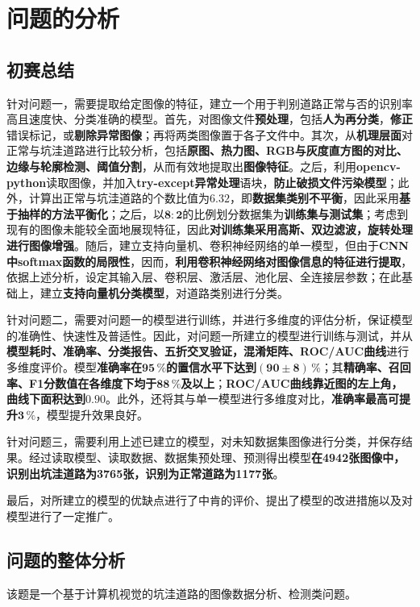 \documentclass{MathorCupmodeling}
\begin{document}
	\section{问题的分析}
	\subsection{初赛总结}
		{\heiti 针对问题一}，需要提取给定图像的特征，建立一个用于判别道路正常与否的识别率高且速度快、分类准确的模型。首先，对图像文件\textbf{预处理}，包括\textbf{人为再分类}，\textbf{修正}错误标记，或\textbf{剔除异常图像}；再将两类图像置于各子文件中。其次，从\textbf{机理层面}对正常与坑洼道路进行比较分析，包括\textbf{原图、热力图、RGB与灰度直方图的对比、边缘与轮廓检测、阈值分割}，从而有效地提取出\textbf{图像特征}。之后，利用\textbf{opencv-python}读取图像，并加入\textbf{try-except异常处理}语块，\textbf{防止破损文件污染模型}；此外，计算出正常与坑洼道路的个数比值为$\boldsymbol{6.32}$，即\textbf{数据集类别不平衡}，因此采用\textbf{基于抽样的方法平衡化}；之后，以$\boldsymbol{8:2}$的比例划分数据集为\textbf{训练集与测试集}；考虑到现有的图像未能较全面地展现特征，因此\textbf{对训练集采用高斯、双边滤波，旋转处理进行图像增强}。随后，建立支持向量机、卷积神经网络的单一模型，但由于\textbf{CNN中softmax函数的局限性}，因而，\textbf{利用卷积神经网络对图像信息的特征进行提取}，依据上述分析，设定其输入层、卷积层、激活层、池化层、全连接层参数；在此基础上，建立\textbf{支持向量机分类模型}，对道路类别进行分类。

		{\heiti 针对问题二}，需要对问题一的模型进行训练，并进行多维度的评估分析，保证模型的准确性、快速性及普适性。因此，对问题一所建立的模型进行训练与测试，并从\textbf{模型耗时、准确率、分类报告、五折交叉验证，混淆矩阵、ROC/AUC曲线}进行多维度评价。模型\textbf{准确率在$\boldsymbol{95\,\%}$的置信水平下达到$\boldsymbol{\left(90\pm 8\right)\,\%}$}；其\textbf{精确率、召回率、F1分数值在各维度下均于$\boldsymbol{88\,\%}$及以上}；\textbf{ROC/AUC曲线靠近图的左上角，曲线下面积达到$\boldsymbol{0.90}$}。此外，还将其与单一模型进行多维度对比，\textbf{准确率最高可提升$\boldsymbol{3\,\%}$}，模型提升效果良好。

		{\heiti 针对问题三}，需要利用上述已建立的模型，对未知数据集图像进行分类，并保存结果。经过读取模型、读取数据、数据集预处理、预测得出模型\textbf{在4942张图像中，识别出坑洼道路为3765张，识别为正常道路为1177张}。
		
		{\heiti 最后}，对所建立的模型的优缺点进行了中肯的评价、提出了模型的改进措施以及对模型进行了一定推广。
	\subsection{问题的整体分析}
	该题是一个基于计算机视觉的坑洼道路的图像数据分析、检测类问题。
\end{document}
